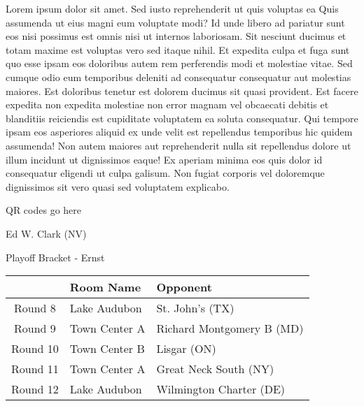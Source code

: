 \documentclass{article}%
\begin{document}
\vspace*{8pt}%
\linebreak%
\newline%
\newline%
Lorem ipsum dolor sit amet. Sed iusto reprehenderit ut quis voluptas ea Quis assumenda ut eius magni eum voluptate modi? Id unde libero ad pariatur sunt eos nisi possimus est omnis nisi ut internos laboriosam. Sit nesciunt ducimus et totam maxime est voluptas vero sed itaque nihil. Et expedita culpa et fuga sunt quo esse ipsam eos doloribus autem rem perferendis modi et molestiae vitae.\newline%
\newline%
Sed cumque odio eum temporibus deleniti ad consequatur consequatur aut molestias maiores. Est doloribus tenetur est dolorem ducimus sit quasi provident. Est facere expedita non expedita molestiae non error magnam vel obcaecati debitis et blanditiis reiciendis est cupiditate voluptatem ea soluta consequatur. Qui tempore ipsam eos asperiores aliquid ex unde velit est repellendus temporibus hic quidem assumenda!\newline%
\newline%
Non autem maiores aut reprehenderit nulla sit repellendus dolore ut illum incidunt ut dignissimos eaque! Ex aperiam minima eos quis dolor id consequatur eligendi ut culpa galisum. Non fugiat corporis vel doloremque dignissimos sit vero quasi sed voluptatem explicabo.\newline%
\newline%
%
\vspace*{30pt}%
\begin{center}%
\begin{Huge}%
QR codes go here%
\end{Huge}%
\end{center}%
\newpage%
\begin{center}%
\begin{Huge}%
Ed W. Clark (NV)%
\end{Huge}%
\vspace*{8pt}%
\linebreak%
\begin{Large}%
Playoff Bracket {-} Ernst%
\end{Large}%
\end{center}%
%
\begin{tabularx}{\textwidth}{|c|Y|Y|}%
\hline%
&Room Name&Opponent\\%
\hline%
Round 8&Lake Audubon&St. John's (TX)\\%
Round 9&Town Center A&Richard Montgomery B (MD)\\%
Round 10&Town Center B&Lisgar (ON)\\%
Round 11&Town Center A&Great Neck South (NY)\\%
Round 12&Lake Audubon&Wilmington Charter (DE)\\%
\hline%
\end{tabularx}%
\end{document}

